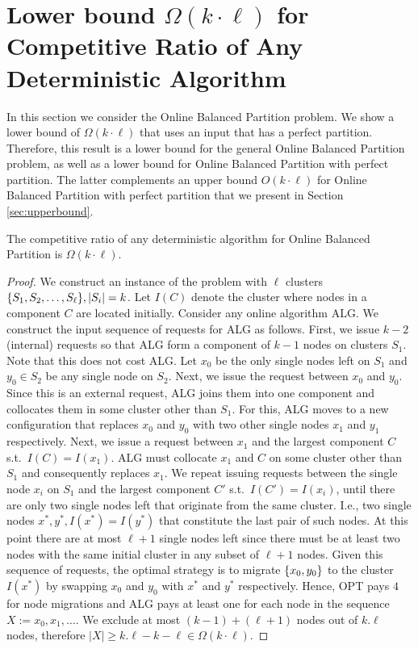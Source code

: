 \documentclass[manuscript,screen=true]{acmart}
\DeclarePairedDelimiter\set{\{}{\}}
\begin{document}
\section{Lower bound $\Omega(k\cdot \ell)$ for Competitive Ratio of Any Deterministic Algorithm}

In this section we consider the Online Balanced Partition problem.
We show a lower bound of $\Omega(k \cdot \ell)$ that uses an input that has a perfect partition.
Therefore, this result is a lower bound for the general Online Balanced Partition problem, as well as a lower bound for Online Balanced Partition with perfect partition.
The latter complements an upper bound $O(k \cdot \ell)$ for Online Balanced Partition with perfect partition that we present in Section \ref{sec:upperbound}.

\begin{theorem}
  The competitive ratio of any deterministic algorithm for Online Balanced Partition is $\Omega(k\cdot \ell)$.
\end{theorem}

\begin{proof}
We construct an instance of the problem with $\ell$ clusters 
$\set{ S_1, S_2,\dots , S_{\ell}}, |S_i|  = k$.
Let $I(C)$ denote the cluster where nodes in a component $C$ are located initially.
Consider any online algorithm ALG.
We construct the input sequence of requests for ALG as follows.
First,
we issue $k-2$ (internal) requests so that ALG form a component of $k-1$
nodes on clusters $S_1$.
Note that this does not cost ALG.
Let $x_0$  be the only single nodes left on $S_1$ and  $y_0 \in S_2$ be any single node on $S_2$.
Next,
we issue the request between $x_0$ and $y_0$.
Since this is an external request,
ALG joins them into one component and collocates them in some cluster other than $S_1$.
For this,
ALG moves to a new configuration that replaces $x_0$ and $y_0$ with two other single nodes $x_1$ and $y_1$ respectively.
Next,
we issue a request between $x_1$ and the largest component $C$ s.t.~$I(C) = I(x_1)$.
ALG must collocate $x_1$ and $C$ on some cluster other than $S_1$ and
consequently replaces $x_1$.
We repeat issuing requests between the single node $x_i$ on $S_1$ and the largest component $C'$ s.t.~$I(C')=I(x_i)$,
 until there are only two single nodes left that  originate from the same cluster.
I.e.,
two single nodes $x^*, y^*,I(x^*) = I(y^*)$
that constitute the last pair of such nodes.
At this point there are at most $\ell+1$ single nodes left
since there must be at least two nodes with the same initial cluster in any subset of $\ell+1$
nodes.
Given this sequence of requests,
the optimal strategy is to migrate $\set{x_0,y_0}$ to the cluster $I(x^*)$ by
 swapping $x_0$ and $y_0$ with $x^*$ and $y^*$ respectively.
Hence,
OPT pays $4$ for node migrations and
ALG pays at least one for each node in the sequence $X := x_0, x_1,\dots$.
We exclude at most $(k-1) + ( \ell+1)$ nodes out of $k.\ell$ nodes,
therefore $|X| \geq k.\ell - k - \ell \in \Omega(k\cdot\ell)$.
\end{proof}
\end{document}
